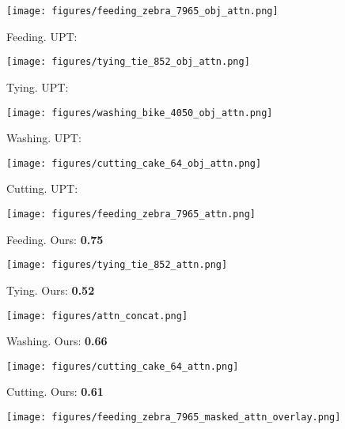 \documentclass[10pt,twocolumn,letterpaper]{article}
\begin{document}
\begin{figure*}[t]\captionsetup[subfigure]{font=footnotesize}
   \begin{subfigure}[t]{0.245\linewidth}
     \centering
     \texttt{[image: figures/feeding\_zebra\_7965\_obj\_attn.png]}
     \caption{Feeding. UPT: }
     \label{fig:comp_1}
   \end{subfigure}\hfill
   \begin{subfigure}[t]{0.245\linewidth}
     \centering
     \texttt{[image: figures/tying\_tie\_852\_obj\_attn.png]}
     \caption{Tying. UPT: }
     \label{fig:comp_3}
   \end{subfigure}\hfill
   \begin{subfigure}[t]{0.245\linewidth}
     \centering
     \texttt{[image: figures/washing\_bike\_4050\_obj\_attn.png]}
     \caption{Washing. UPT: }
     \label{fig:comp_2}
   \end{subfigure}\hfill
   \begin{subfigure}[t]{0.245\linewidth}
     \centering
     \texttt{[image: figures/cutting\_cake\_64\_obj\_attn.png]}
     \caption{Cutting. UPT: }
     \label{fig:comp_4}
   \end{subfigure}\vfill \begin{subfigure}[t]{0.245\linewidth}
      \centering
      \texttt{[image: figures/feeding\_zebra\_7965\_attn.png]}
      \caption{Feeding. Ours: \textbf{0.75}}
      \label{fig:comp_1_ours}
   \end{subfigure}\hfill
   \begin{subfigure}[t]{0.245\linewidth}
      \texttt{[image: figures/tying\_tie\_852\_attn.png]}
      \caption{Tying. Ours: \textbf{0.52}}
      \label{fig:comp_3_ours}
   \end{subfigure}\hfill
   \begin{subfigure}[t]{0.245\linewidth}
      \centering
      \texttt{[image: figures/attn\_concat.png]}
      \caption{Washing. Ours: \textbf{0.66}}
      \label{fig:comp_2_ours}
   \end{subfigure}\hfill
   \begin{subfigure}[t]{0.245\linewidth}
      \texttt{[image: figures/cutting\_cake\_64\_attn.png]}
      \caption{Cutting. Ours: \textbf{0.61}}
      \label{fig:comp_4_ours}
   \end{subfigure}\vfill \begin{subfigure}[t]{0.245\linewidth}
      \centering
      \texttt{[image: figures/feeding\_zebra\_7965\_masked\_attn\_overlay.png]}

\end{subfigure}
\end{figure*}
\end{document}
